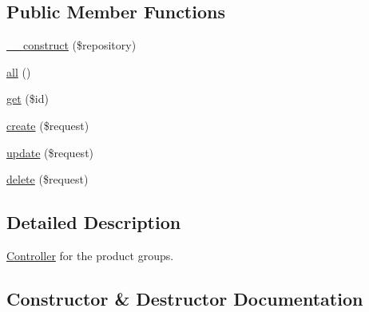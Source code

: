 \subsection*{Public Member Functions}
\begin{DoxyCompactItemize}
\item 
\mbox{\hyperlink{class_app_1_1_http_1_1_controllers_1_1_product_1_1_group_controller_a5b75ba6bc9debb999c0186a31978ec03}{\+\_\+\+\_\+construct}} (\$repository)
\item 
\mbox{\hyperlink{class_app_1_1_http_1_1_controllers_1_1_product_1_1_group_controller_af9d14e4ae6227970ad603987781573ca}{all}} ()
\item 
\mbox{\hyperlink{class_app_1_1_http_1_1_controllers_1_1_product_1_1_group_controller_a50e3bfb586b2f42932a6a93f3fbb0828}{get}} (\$id)
\item 
\mbox{\hyperlink{class_app_1_1_http_1_1_controllers_1_1_product_1_1_group_controller_a4fa811c83f27da01b0d92bdb2a711a13}{create}} (\$request)
\item 
\mbox{\hyperlink{class_app_1_1_http_1_1_controllers_1_1_product_1_1_group_controller_ab7b27a90191560dcef32126b0945db0d}{update}} (\$request)
\item 
\mbox{\hyperlink{class_app_1_1_http_1_1_controllers_1_1_product_1_1_group_controller_a126a3799c44d72393ca4732081306dfd}{delete}} (\$request)
\end{DoxyCompactItemize}


\subsection{Detailed Description}
\mbox{\hyperlink{class_app_1_1_http_1_1_controllers_1_1_controller}{Controller}} for the product groups. 

\subsection{Constructor \& Destructor Documentation}
\mbox{\label{class_app_1_1_http_1_1_controllers_1_1_product_1_1_group_controller_a5b75ba6bc9debb999c0186a31978ec03}} 

